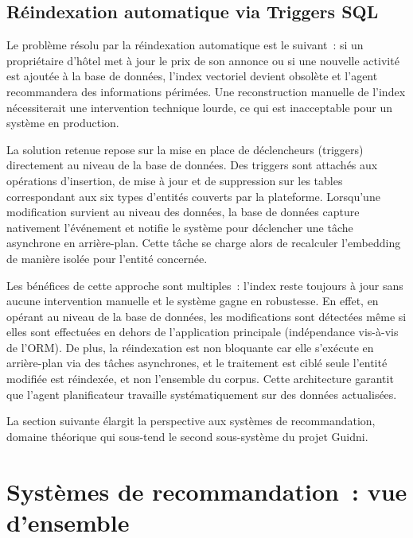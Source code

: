 \subsection{Réindexation automatique via Triggers SQL}

Le problème résolu par la réindexation automatique est le suivant~: si un propriétaire d'hôtel 
met à jour le prix de son annonce ou si une nouvelle activité est ajoutée à la base de données, 
l'index vectoriel devient obsolète et l'agent recommandera des informations périmées. Une reconstruction 
manuelle de l'index nécessiterait une intervention technique lourde, ce qui est inacceptable pour un système en production.

La solution retenue repose sur la mise en place de déclencheurs (triggers) directement au niveau 
de la base de données. Des triggers sont attachés aux opérations d'insertion, de mise à jour et de suppression 
sur les tables correspondant aux six types d'entités couverts par la plateforme. Lorsqu'une modification survient 
au niveau des données, la base de données capture nativement l'événement et notifie le système pour déclencher une 
tâche asynchrone en arrière-plan. Cette tâche se charge alors de recalculer l'embedding de manière isolée pour l'entité concernée.

Les bénéfices de cette approche sont multiples~: l'index reste toujours 
à jour sans aucune intervention manuelle et le système gagne en robustesse. En effet, en opérant au niveau 
de la base de données, les modifications sont détectées même si elles sont effectuées en dehors de l'application 
principale (indépendance vis-à-vis de l'ORM). De plus, la réindexation est non bloquante car elle s'exécute en 
arrière-plan via des tâches asynchrones, et le traitement est ciblé   seule l'entité modifiée est réindexée, 
et non l'ensemble du corpus. Cette architecture garantit que l'agent planificateur travaille systématiquement sur 
des données actualisées.

La section suivante élargit la perspective aux systèmes de recommandation, domaine théorique qui sous-tend 
le second sous-système du projet Guidni.


\section{Systèmes de recommandation~: vue d'ensemble}

